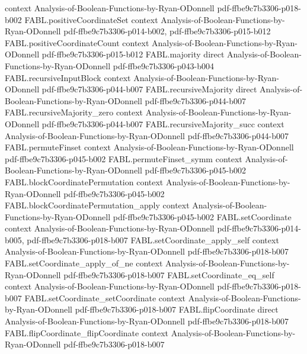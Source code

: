 \begin{theorem}
  {context}
  {Analysis-of-Boolean-Functions-by-Ryan-ODonnell}
  {pdf-ffbe9c7b3306-p018-b002}
\proofstep
  {FABL.positiveCoordinateSet}
  {context}
  {Analysis-of-Boolean-Functions-by-Ryan-ODonnell}
  {pdf-ffbe9c7b3306-p014-b002,
    pdf-ffbe9c7b3306-p015-b012}
\proofstep
  {FABL.positiveCoordinateCount}
  {context}
  {Analysis-of-Boolean-Functions-by-Ryan-ODonnell}
  {pdf-ffbe9c7b3306-p015-b012}
\proofstep
  {FABL.majority}
  {direct}
  {Analysis-of-Boolean-Functions-by-Ryan-ODonnell}
  {pdf-ffbe9c7b3306-p043-b004}
\proofstep
  {FABL.recursiveInputBlock}
  {context}
  {Analysis-of-Boolean-Functions-by-Ryan-ODonnell}
  {pdf-ffbe9c7b3306-p044-b007}
\proofstep
  {FABL.recursiveMajority}
  {direct}
  {Analysis-of-Boolean-Functions-by-Ryan-ODonnell}
  {pdf-ffbe9c7b3306-p044-b007}
\proofstep
  {FABL.recursiveMajority_zero}
  {context}
  {Analysis-of-Boolean-Functions-by-Ryan-ODonnell}
  {pdf-ffbe9c7b3306-p044-b007}
\proofstep
  {FABL.recursiveMajority_succ}
  {context}
  {Analysis-of-Boolean-Functions-by-Ryan-ODonnell}
  {pdf-ffbe9c7b3306-p044-b007}
\proofstep
  {FABL.permuteFinset}
  {context}
  {Analysis-of-Boolean-Functions-by-Ryan-ODonnell}
  {pdf-ffbe9c7b3306-p045-b002}
\proofstep
  {FABL.permuteFinset_symm}
  {context}
  {Analysis-of-Boolean-Functions-by-Ryan-ODonnell}
  {pdf-ffbe9c7b3306-p045-b002}
\proofstep
  {FABL.blockCoordinatePermutation}
  {context}
  {Analysis-of-Boolean-Functions-by-Ryan-ODonnell}
  {pdf-ffbe9c7b3306-p045-b002}
\proofstep
  {FABL.blockCoordinatePermutation_apply}
  {context}
  {Analysis-of-Boolean-Functions-by-Ryan-ODonnell}
  {pdf-ffbe9c7b3306-p045-b002}
\proofstep
  {FABL.setCoordinate}
  {context}
  {Analysis-of-Boolean-Functions-by-Ryan-ODonnell}
  {pdf-ffbe9c7b3306-p014-b005,
    pdf-ffbe9c7b3306-p018-b007}
\proofstep
  {FABL.setCoordinate_apply_self}
  {context}
  {Analysis-of-Boolean-Functions-by-Ryan-ODonnell}
  {pdf-ffbe9c7b3306-p018-b007}
\proofstep
  {FABL.setCoordinate_apply_of_ne}
  {context}
  {Analysis-of-Boolean-Functions-by-Ryan-ODonnell}
  {pdf-ffbe9c7b3306-p018-b007}
\proofstep
  {FABL.setCoordinate_eq_self}
  {context}
  {Analysis-of-Boolean-Functions-by-Ryan-ODonnell}
  {pdf-ffbe9c7b3306-p018-b007}
\proofstep
  {FABL.setCoordinate_setCoordinate}
  {context}
  {Analysis-of-Boolean-Functions-by-Ryan-ODonnell}
  {pdf-ffbe9c7b3306-p018-b007}
\proofstep
  {FABL.flipCoordinate}
  {direct}
  {Analysis-of-Boolean-Functions-by-Ryan-ODonnell}
  {pdf-ffbe9c7b3306-p018-b007}
\proofstep
  {FABL.flipCoordinate_flipCoordinate}
  {context}
  {Analysis-of-Boolean-Functions-by-Ryan-ODonnell}
  {pdf-ffbe9c7b3306-p018-b007}
\proofstep

\end{theorem}
